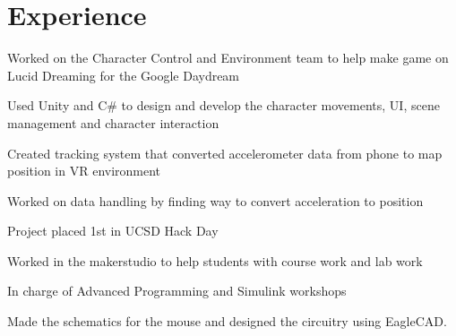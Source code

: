 \documentclass[]{deedy-resume-openfont}
\begin{document}
\hfill
\begin{minipage}[t]{0.66\textwidth} 


\section{Experience}

\sectionsep
\begin{tightemize} 
\item Worked on the Character Control and Environment team to help make game on Lucid Dreaming for the Google Daydream
\item Used Unity and C\# to design and develop the character movements, UI, scene management and character interaction
\end{tightemize}
\sectionsep

\begin{tightemize}
\item Created tracking system that converted accelerometer data from phone to map position in VR environment
\item Worked on data handling by finding way to convert acceleration to position
\item Project placed 1st in UCSD Hack Day
\end{tightemize}
\sectionsep

\begin{tightemize}
\item Worked in the makerstudio to help students with course work and lab work
\item In charge of Advanced Programming and Simulink workshops
\end{tightemize}
\sectionsep

\begin{tightemize}
\item Made the schematics for the mouse and designed the circuitry using EagleCAD.
\end{tightemize}
\sectionsep


\end{minipage}
\end{document}
